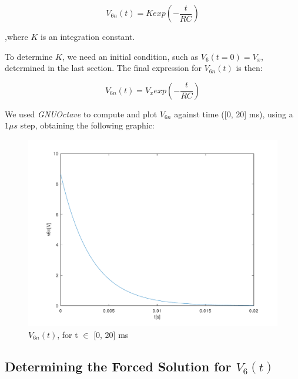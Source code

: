 



\begin{center}
  \begin{equation}
    V_{6n}(t) = K exp\left(-\frac{t}{RC}\right)
  \end{equation} 
\end{center}


,where $K$ is an integration constant.

To determine $K$, we need an initial condition, such as $V_6(t=0) = V_x$, determined in the last section. The final expression for $V_{6n}(t)$ is then:

\begin{center}
  \begin{equation}
    V_{6n}(t) = V_x exp\left(-\frac{t}{RC}\right)
  \end{equation} 
\end{center}



We used \textit{GNUOctave} to compute and plot $V_{6n}$ against time ([0, 20] ms), using a $1\mu s$ step, obtaining the following graphic:


\begin{figure}[h] \centering
\includegraphics[width=0.6\linewidth]{../mat/t2-t3.pdf}
\caption{$V_{6n}(t)$, for t $\in$ [0, 20] ms}
\label{fig4}
\end{figure}


\newpage
\subsection{Determining the Forced Solution for $V_6(t)$}

